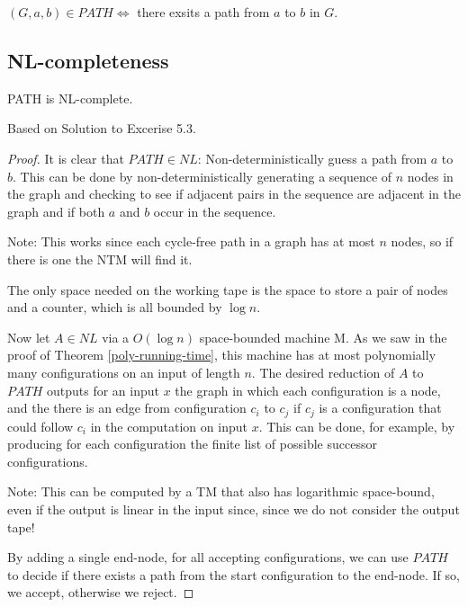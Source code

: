 $(G, a, b) \in PATH \Leftrightarrow $ there exsits a path from $a$ to
$b$ in $G$.

\subsection{NL-completeness}\label{nl-completeness}

\vspace{0.5cm}

\begin{thm}
\label{path-nl-complete}
PATH is NL-complete.
\end{thm}

Based on  Solution to Excerise
5.3.

\begin{proof}
It is clear that $PATH \in NL$: Non-deterministically guess a path from
$a$ to $b$. This can be done by non-deterministically generating a sequence of $n$
nodes in the graph and checking to see if adjacent pairs in the sequence are
adjacent in the graph and if both $a$ and $b$ occur in the sequence.

Note: This works since each cycle-free path in a graph has at most $n$ nodes, so if there is one the NTM will find it.

The only space needed on the working tape is the space to store a pair of nodes and a counter, which is all bounded by $\log n$.

Now let $A \in NL$ via a $O(\log n)$ space-bounded machine M. As we saw in the proof of Theorem \ref{poly-running-time},
this machine has at most polynomially many configurations on an input of length $n$.
The desired reduction of $A$ to $PATH$ outputs for an input $x$ the
graph in which each configuration is a node, and the there is an edge
from configuration $c_i$ to $c_j$ if $c_j$ is a configuration that could follow $c_i$ in the computation on
input $x$. This can be done, for example, by producing for each configuration the finite list of possible successor configurations.

Note: This can be computed by a TM that also has logarithmic space-bound, even if the output is linear in the input since,
since we do not consider the output tape!

By adding a single end-node, for all accepting configurations, we can use $PATH$ to decide if there exists a path
from the start configuration to the end-node. If so, we accept, otherwise we reject.
\end{proof}

